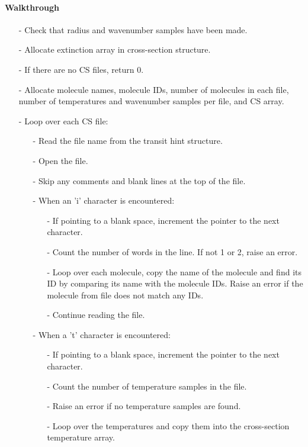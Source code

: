 \documentclass[letterpaper,12pt]{article}
\begin{document}
\paragraph{Walkthrough}
\begin{enumerate}[leftmargin=10pt, noitemsep, parsep=0pt, topsep=0ex]
\item[-] Check that radius and wavenumber samples have been made.
\item[-] Allocate extinction array in cross-section structure.
\item[-] If there are no CS files, return 0.
\item[-] Allocate molecule names, molecule IDs, number of molecules in each file, number of temperatures and wavenumber samples per file, and CS array.
\item[-] Loop over each CS file:
\begin{enumerate}[leftmargin=10pt, noitemsep, parsep=0pt, topsep=0ex]
\item[-] Read the file name from the transit hint structure.
\item[-] Open the file.
\item[-] Skip any comments and blank lines at the top of the file.
\item[-] When an 'i' character is encountered:
\begin{enumerate}[leftmargin=10pt, noitemsep, parsep=0pt, topsep=0ex]
\item[-] If pointing to a blank space, increment the pointer to the next character.
\item[-] Count the number of words in the line. If not 1 or 2, raise an error.
\item[-] Loop over each molecule, copy the name of the molecule and find its ID by comparing its name with the molecule IDs. Raise an error if the molecule from file does not match any IDs.
\item[-] Continue reading the file.
\end{enumerate}
\item[-] When a 't' character is encountered:
\begin{enumerate}[leftmargin=10pt, noitemsep, parsep=0pt, topsep=0ex]
\item[-] If pointing to a blank space, increment the pointer to the next character.
\item[-] Count the number of temperature samples in the file.
\item[-] Raise an error if no temperature samples are found.
\item[-] Loop over the temperatures and copy them into the cross-section temperature array.

\end{enumerate}
\end{enumerate}
\end{enumerate}
\end{document}
